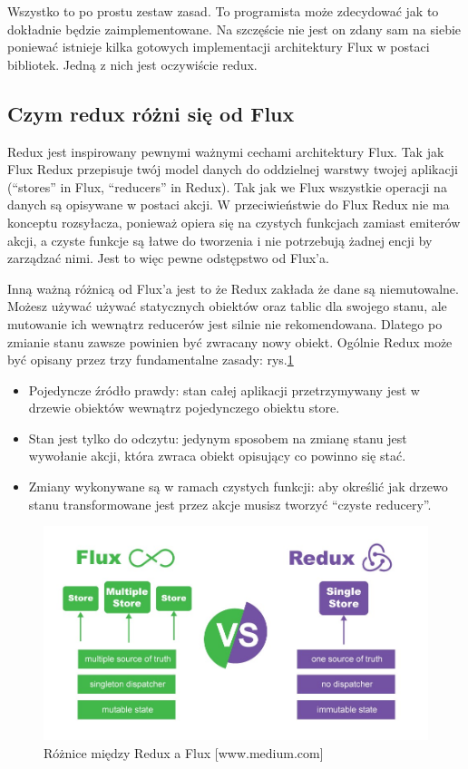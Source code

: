 Wszystko to po prostu zestaw zasad.
To programista może zdecydować jak to dokładnie będzie zaimplementowane.
Na szczęście nie jest on zdany sam na siebie poniewać istnieje kilka gotowych implementacji architektury Flux w postaci bibliotek.\cite{www_nafrontendzie}
Jedną z nich jest oczywiście redux.

\subsection{Czym redux różni się od Flux}

Redux jest inspirowany pewnymi ważnymi cechami architektury Flux.
Tak jak Flux Redux przepisuje twój model danych do oddzielnej warstwy twojej aplikacji (“stores” in Flux, “reducers” in Redux).
Tak jak we Flux wszystkie operacji na danych są opisywane w postaci akcji.
W przeciwieństwie do Flux Redux nie ma konceptu rozsyłacza,
ponieważ opiera się na czystych funkcjach zamiast emiterów akcji,
a czyste funkcje są łatwe do tworzenia i nie potrzebują żadnej encji by zarządzać nimi.
Jest to więc pewne odstępstwo od Flux’a.\cite{www_nafrontendzie} 

Inną ważną różnicą od Flux’a jest to że Redux zakłada że dane są niemutowalne.
Możesz używać używać statycznych obiektów oraz tablic dla swojego stanu,
ale mutowanie ich wewnątrz reducerów jest silnie nie rekomendowana.
Dlatego po zmianie stanu zawsze powinien być zwracany nowy obiekt.
Ogólnie Redux może być opisany przez trzy fundamentalne zasady:
rys.\ref{rys:reduxFlux}
\begin{itemize}
	\item Pojedyncze źródło prawdy: stan całej aplikacji przetrzymywany jest w drzewie obiektów wewnątrz pojedynczego obiektu store.
	\item Stan jest tylko do odczytu: jedynym sposobem na zmianę stanu jest wywołanie akcji, która zwraca obiekt opisujący co powinno się stać.
	\item Zmiany wykonywane są w ramach czystych funkcji: aby określić jak drzewo stanu transformowane jest przez akcje musisz tworzyć “czyste reducery”.
\end{itemize}

\begin{figure}
	\centering\includegraphics[width=.6\textwidth]{img/reduxFlux}
	\caption{Różnice między Redux a Flux [www.medium.com]}\label{rys:reduxFlux}%
\end{figure}

